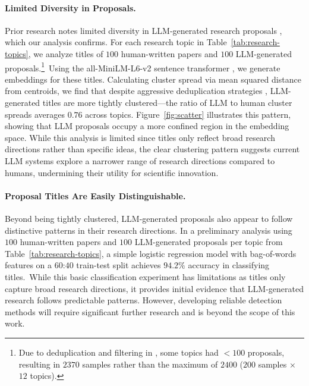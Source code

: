 \paragraph{Limited Diversity in Proposals.}
\label{para:titles-clustering} 
Prior research notes limited diversity in LLM-generated research proposals \citep{si2024can}, 
which our analysis confirms. 
For each research topic in Table~\ref{tab:research-topics}, 
we analyze titles of $100$ human-written papers and $100$ LLM-generated proposals.\footnote{Due to deduplication and filtering in \citep{si2024can}, some topics had $< 100$ proposals, resulting in $2370$ samples rather than the maximum of $2400$ ($200$ samples $\times$ $12$ topics).\label{footnote:less-samples}}\ 
Using the all-MiniLM-L6-v2 sentence transformer \citep{reimers2020making}, 
we generate embeddings for these titles.
Calculating cluster spread via mean squared distance from centroids, 
we find that despite aggressive deduplication strategies \citep{si2024can}, 
LLM-generated titles are more tightly clustered---the ratio of LLM to human cluster 
spreads averages $0.76$ across topics. 
Figure~\ref{fig:scatter} illustrates this pattern, 
showing that LLM proposals occupy a more confined region in the embedding space. 
While this analysis is limited since titles only reflect broad research directions rather than specific ideas,
the clear clustering pattern suggests current LLM systems explore a narrower range of research directions compared to humans, 
undermining their utility for scientific innovation.


\paragraph{Proposal Titles Are Easily Distinguishable.}
\label{para:titles-classification} 
Beyond being tightly clustered, 
LLM-generated proposals also appear to follow distinctive patterns in their research directions. 
In a preliminary analysis using $100$ human-written papers
and $100$ LLM-generated proposals per topic from Table~\ref{tab:research-topics}, 
a simple logistic regression model with bag-of-words features on a $60$:$40$ train-test split 
achieves $94.2\%$ accuracy in classifying titles.\footref{footnote:less-samples}\ 
While this basic classification experiment has limitations as titles only capture broad research directions, 
it provides initial evidence that LLM-generated research follows predictable patterns. 
However, developing reliable detection methods will require significant further research 
and is beyond the scope of this work.

